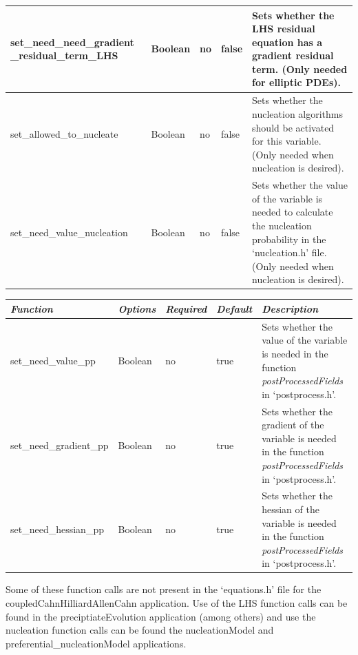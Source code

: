 \documentclass[10pt]{article} %
\begin{document}
\begin{center}
\begin{tabular}{ | p{} | p{}| p{} | p{} | p{} |}
    set\_need\_need\_gradient \_residual\_term\_LHS & Boolean & no & false & Sets whether the LHS residual equation has a gradient residual term. (Only needed for elliptic PDEs). \\ \hline
    set\_allowed\_to\_nucleate & Boolean & no & false & Sets whether the nucleation algorithms should be activated for this variable. (Only needed when nucleation is desired). \\ \hline
    set\_need\_value\_nucleation & Boolean & no & false & Sets whether the value of the variable is needed to calculate the nucleation probability in the `nucleation.h' file. (Only needed when nucleation is desired). \\ \hline
    \end{tabular}
\end{center}
\normalsize

\footnotesize
\begin{center}
    \begin{tabular}{ | p{} | p{}| p{} | p{} | p{} |}
    \hline
    \emph{Function}  & \emph{Options} & \emph{Required} & \emph{Default} & \emph{Description} \\ \hline
    set\_need\_value\_pp & Boolean & no & true  & Sets whether the value of the variable is needed in the function \emph{postProcessedFields} in `postprocess.h'. \\ \hline
    set\_need\_gradient\_pp & Boolean & no & true & Sets whether the gradient of the variable is needed in the function \emph{postProcessedFields} in `postprocess.h'. \\ \hline
    set\_need\_hessian\_pp & Boolean & no & true & Sets whether the hessian of the variable is needed in the function \emph{postProcessedFields} in `postprocess.h'. \\ \hline
    \end{tabular}
\end{center}
\normalsize

Some of these function calls are not present in the `equations.h' file for the coupledCahnHilliardAllenCahn application. Use of the LHS function calls can be found in the preciptiateEvolution application (among others) and use the nucleation function calls can be found the nucleationModel and preferential\_nucleationModel applications.
\end{document}
